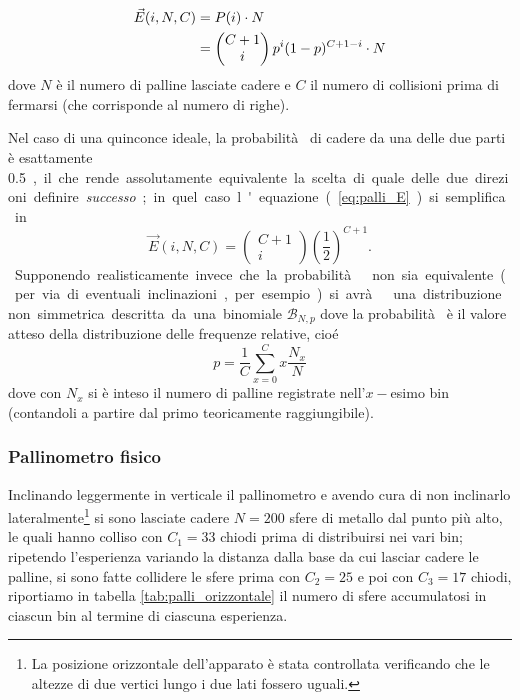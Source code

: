 \documentclass[10pt,oneside,a4paper]{article}
\begin{document}
\begin{align}\label{eq:palli_E}
	\vec{E}(i, N, C) &= P(i) \cdot N \notag \\
		&= \begin{pmatrix} C+1 \\ i \end{pmatrix} p^i (1-p)^{C+1-i}\cdot N
\end{align}
dove $N$ è il numero di palline lasciate cadere e $C$ il numero di collisioni prima di fermarsi (che corrisponde al numero di righe). 

Nel caso di una quinconce ideale, la probabilità  di cadere da una delle due parti è esattamente \SI{0.5}, il che rende assolutamente equivalente la scelta di quale delle due direzioni definire \emph{successo}; in quel caso l'equazione (\ref{eq:palli_E}) si semplifica in
\begin{equation}\label{eq:palli_E_teorico}
	\vec{E}(i, N, C) = \begin{pmatrix} C+1 \\ i \end{pmatrix} \left(\frac{1}{2}\right)^{C+1}.
\end{equation}

Supponendo realisticamente invece che la probabilità  non sia equivalente (per via di eventuali inclinazioni, per esempio) si avrà  una distribuzione non simmetrica descritta da una binomiale $\mathscr{B}_{N, p}$ dove la probabilità  è il valore atteso della distribuzione delle frequenze relative, cioé
\begin{equation}\label{eq:palli_P_vero}
	 p = \frac{1}{C} \sum_{x=0}^{C} x \frac{N_x}{N}
\end{equation} dove con $N_x$ si è inteso il numero di palline registrate nell'$x-$esimo bin (contandoli a partire dal primo teoricamente raggiungibile).

\subsubsection{Pallinometro fisico}
Inclinando leggermente in verticale il pallinometro e avendo cura di non inclinarlo lateralmente\footnote{La posizione orizzontale dell'apparato è stata controllata verificando che le altezze di due vertici lungo i due lati fossero uguali.} si sono lasciate cadere $N = 200$ sfere di metallo dal punto più alto, le quali hanno colliso con $C_1 = 33$ chiodi prima di distribuirsi nei vari bin; ripetendo l'esperienza variando la distanza dalla base da cui lasciar cadere le palline, si sono fatte collidere le sfere prima con $C_2 = 25$ e poi con $C_3 = 17$ chiodi, riportiamo in tabella \ref{tab:palli_orizzontale} il numero di sfere accumulatosi in ciascun bin al termine di ciascuna esperienza.
\end{document}
